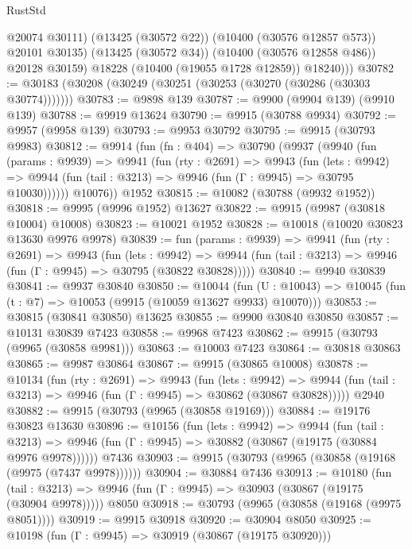 \begin{lexlean}{RustStd}
\begin{coremodule}
{\begin{coremodule}
{{{{{{{{{{{{{{{{{{{{{{{{{                @20074
                @30111)
              (@13425 (@30572 @22))
              (@10400 (@30576 @12857 @573))
              @20101
              @30135)
            (@13425 (@30572 @34))
            (@10400 (@30576 @12858 @486))
            @20128
            @30159)
          @18228
          (@10400 (@19055 @1728 @12859))
          @18240)))
@30782 := @30183 (@30208 (@30249 (@30251 (@30253 (@30270 (@30286 (@30303 @30774)))))))
@30783 := @9898 @139
@30787 := @9900 (@9904 @139) (@9910 @139)
@30788 := @9919 @13624
@30790 := @9915 (@30788 @9934)
@30792 := @9957 (@9958 @139)
@30793 := @9953 @30792
@30795 := @9915 (@30793 @9983)
@30812 := @9914
    (fun (fn : @404) =>
    @30790
      (@9937
        (@9940
          (fun (params : @9939) =>
          @9941
            (fun (rty : @2691) =>
            @9943
              (fun (lets : @9942) =>
              @9944 (fun (tail : @3213) => @9946 (fun (Γ : @9945) => @30795 @10030))))))
        @10076))
    @1952
@30815 := @10082 (@30788 (@9932 @1952))
@30818 := @9995 (@9996 @1952) @13627
@30822 := @9915 (@9987 (@30818 @10004) @10008)
@30823 := @10021 @1952
@30828 := @10018 (@10020 @30823 @13630 @9976 @9978)
@30839 := fun (params : @9939) =>
  @9941
    (fun (rty : @2691) =>
    @9943
      (fun (lets : @9942) =>
      @9944 (fun (tail : @3213) => @9946 (fun (Γ : @9945) => @30795 (@30822 @30828)))))
@30840 := @9940 @30839
@30841 := @9937 @30840
@30850 := @10044
    (fun (U : @10043) => @10045 (fun (t : @7) => @10053 (@9915 (@10059 @13627 @9933) @10070)))
@30853 := @30815 (@30841 @30850) @13625
@30855 := @9900 @30840 @30850
@30857 := @10131 @30839 @7423
@30858 := @9968 @7423
@30862 := @9915 (@30793 (@9965 (@30858 @9981)))
@30863 := @10003 @7423
@30864 := @30818 @30863
@30865 := @9987 @30864
@30867 := @9915 (@30865 @10008)
@30878 := @10134
    (fun (rty : @2691) =>
    @9943
      (fun (lets : @9942) =>
      @9944 (fun (tail : @3213) => @9946 (fun (Γ : @9945) => @30862 (@30867 @30828)))))
    @2940
@30882 := @9915 (@30793 (@9965 (@30858 @19169)))
@30884 := @19176 @30823 @13630
@30896 := @10156
    (fun (lets : @9942) =>
    @9944
      (fun (tail : @3213) =>
      @9946 (fun (Γ : @9945) => @30882 (@30867 (@19175 (@30884 @9976 @9978))))))
    @7436
@30903 := @9915 (@30793 (@9965 (@30858 (@19168 (@9975 (@7437 @9978))))))
@30904 := @30884 @7436
@30913 := @10180
    (fun (tail : @3213) => @9946 (fun (Γ : @9945) => @30903 (@30867 (@19175 (@30904 @9978)))))
    @8050
@30918 := @30793 (@9965 (@30858 (@19168 (@9975 @8051))))
@30919 := @9915 @30918
@30920 := @30904 @8050
@30925 := @10198 (fun (Γ : @9945) => @30919 (@30867 (@19175 @30920)))
}}}}}}}}}}}}}}}}}}}}}}}}}
\end{coremodule}}
\end{coremodule}
\end{lexlean}
